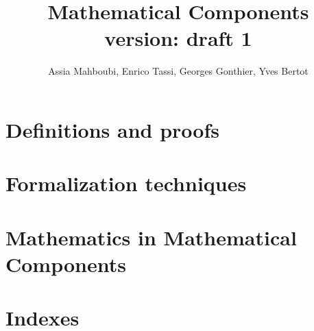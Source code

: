 \documentclass{book}
\title{Mathematical Components\\\small{version: draft 1}}
\author{Assia Mahboubi, Enrico Tassi, Georges Gonthier, Yves Bertot}
\begin{document}
\maketitle



\tableofcontents{}

\part{Definitions and proofs}






\part{Formalization techniques}





\part{Mathematics in Mathematical Components}







\part{Indexes}

\printindex[concept]
\printindex[ssr]
\printindex[coq]
\printindex[vernac]



\end{document}
